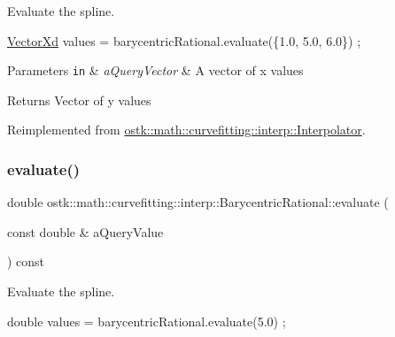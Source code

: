 Evaluate the spline. 


\begin{DoxyCode}
\hyperlink{namespaceostk_1_1math_1_1obj_a84bdc62967e939556fb94869024693ff}{VectorXd} values = barycentricRational.evaluate(\{1.0, 5.0, 6.0\}) ;
\end{DoxyCode}



\begin{DoxyParams}[1]{Parameters}
\mbox{\tt in}  & {\em a\+Query\+Vector} & A vector of x values \\
\hline
\end{DoxyParams}
\begin{DoxyReturn}{Returns}
Vector of y values 
\end{DoxyReturn}


Reimplemented from \hyperlink{classostk_1_1math_1_1curvefitting_1_1interp_1_1_interpolator_aac2035e403234027b227479d1e1b544e}{ostk\+::math\+::curvefitting\+::interp\+::\+Interpolator}.

\mbox{\label{classostk_1_1math_1_1curvefitting_1_1interp_1_1_barycentric_rational_ac4924f9afb399ee21f12f2d9bf381da1}} 
\subsubsection{\texorpdfstring{evaluate()}{evaluate()}\hspace{0.1cm}{\footnotesize\ttfamily [2/2]}}
{\footnotesize\ttfamily double ostk\+::math\+::curvefitting\+::interp\+::\+Barycentric\+Rational\+::evaluate (\begin{DoxyParamCaption}\item[{const double \&}]{a\+Query\+Value }\end{DoxyParamCaption}) const\hspace{0.3cm}{\ttfamily [virtual]}}



Evaluate the spline. 


\begin{DoxyCode}
\textcolor{keywordtype}{double} values = barycentricRational.evaluate(5.0) ;
\end{DoxyCode}



